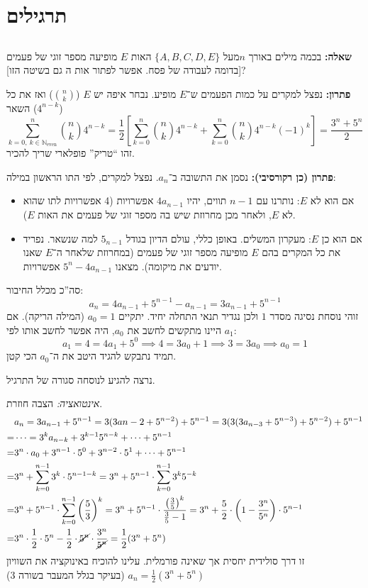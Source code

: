 \documentclass[]{article}
\newcommand\N     {\mathbb{N}}
\newcommand\Neven {\N_{\mathrm{even}}}
\newcommand\sumnk     {\sum_{k = 0}^{n}}
\newcommand\bink      {\binom{n}{k}}
\begin{document}
	\section{תרגילים}
	
	\subsection{}
	\textbf{שאלה: }בכמה מילים באורך $n $מעל $\{A, B, C, D, E \}$ האות $E$ מופיעה מספר זוגי של פעמים [בדומה לעבודה של פסח. אפשר לפתור אות ה גם בשיטה הזו]? 
	
	\textbf{פתרון: }נפצל למקרים על כמות הפעמים ש־$E $ מופיע. נבחר איפה יש $E$ ($\bink$) ואז את כל השאר ($4^{n - k}$)
	\[ \sum_{k = 0, \ k \in \Neven}^{n} \binom{n}{k}4^{n - k} = \frac{1}{2} \left [\sumnk \bink 4^{n - k} + \sumnk \bink 4^{n - k}(-1)^{k}\right ] = \frac{3^n + 5^n}{2} \]
	זהו ``טריק'' פופלארי שריך להכיר. 
	
	\textbf{פתרון (כן רקורסיבי): }נסמן את התשובה ב־$a_n$. נפצל למקרים, לפי התו הראשון במילה: 
	\begin{itemize}
		\item אם הוא לא $E$: נותרנו עם $n - 1$ תווים, יהיו $4a_{n - 1}$ אפשרויות (4 אפשרויות לתו שהוא לא $E$, ולאחר מכן מחרוזת שיש בה מספר זוגי של פעמים את האות $E$). 
		\item אם הוא כן $E$: מעקרון המשלים. באופן כללי, עולם הדיון בגודל $5_{n - 1}$ למה שנשאר. נפריד את כל המקרים בהם $E$ מופיעה מספר זוגי של פעמים (במחרוזת שלאחר ה־$E$ שאנו יודעים את מיקומה). מצאנו $5^n - 4a_{n - 1}$ אפשרויות. 
	\end{itemize}
	סה''כ מכלל החיבור: 
	\[ a_n = 4a_{n - 1} + 5^{n - 1} - a_{n - 1} = 3a_{n - 1} + 5^{n - 1} \]
	זוהי נוסחת נסיגה מסדר $1$ ולכן נגדיר תנאי התחלה יחיד. יתקיים $a_0 = 1 $ (המילה הריקה). אם היינו מתקשים לחשב את $a_0 $, היה אפשר לחשב אותו לפי $a_1 $: 
	\[ a_1 = 4 = 4a_1 + 5^0 \implies 4 = 3a_0 + 1 \implies 3 = 3a_0 \implies a_0 = 1 \]
	תמיד נתבקש להגיד היטב את ה־$a_0 $ הכי קטן. 
	
	נרצה להגיע לנוסחה סגורה של התרגיל. 
	
	\textit{אינטואציה: }הצבה חוזרת. 
	\begin{align}
		&a_n = 3a_{n - 1} + 5^{n - 1} = 3(3a{n - 2} + 5^{n - 2}) + 5^{n - 1} = 3(3(3a_{n - 3} + 5^{n - 3} ) + 5^{n-  2}) + 5^{n - 1} \\
		= &\dots = 3^ka_{n - k} + 3^{k - 1}5^{n - k} + \dots + 5^{n - 1} \\
		= &3^n \cdot a_0 + 3^{n - 1}\cdot 5^0 + 3^{n - 2} \cdot 5^1 + \dots + 5^{n - 1} \\
		= &3^n + \sum_{k = 0}^{n - 1}3^k \cdot 5^{n - 1 - k} = 3^n + 5^{n - 1} \cdot \sum_{k = 0}^{n - 1}3^k5^{-k} \\
		= &3^{n} + 5^{n - 1} \cdot \sum_{k = 0}^{n - 1}\left (\frac{5}{3} \right )^k = 3^n + 5^{n - 1} \cdot \frac{\left  (\frac{3}{5} \right  )^k}{\frac{3}{5} - 1} = 3^n + \frac{5}{2} \cdot \left (1 - \frac{3^n}{5^n}\right ) \cdot 5^{n - 1} \\
		= &3^n \cdot \frac{1}{2} \cdot 5^n - \frac{1}{2} \cdot \cancel{5^n} \cdot \frac{3^n}{\cancel{5^n}} = \frac{1}{2}(3^n + 5^n)
	\end{align}
	זו דרך סולידית יחסית אך שאינה פורמלית. עלינו להוכיח באינוקציה את השוויון $a_n = \frac{1}{2} (3^n + 5^n)$ (בעיקר בגלל המעבר בשורה 3)
	
\end{document}
